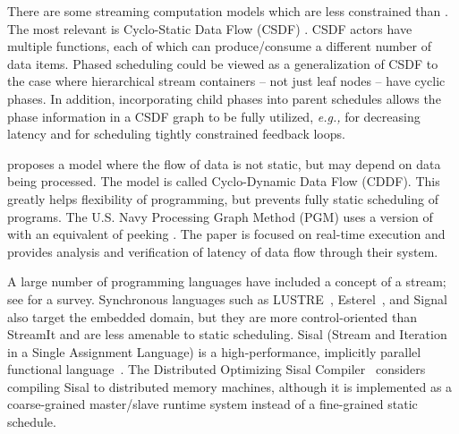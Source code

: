 There are some streaming computation models which are less constrained
than {\SDF}. The most relevant is Cyclo-Static Data Flow (CSDF)
\cite{BELP96,parks95comparison}.  CSDF actors have multiple {\work}
functions, each of which can produce/consume a different number of
data items.  Phased scheduling could be viewed as a generalization of
CSDF to the case where hierarchical stream containers -- not just leaf
nodes -- have cyclic phases.  In addition, incorporating child phases
into parent schedules allows the phase information in a CSDF graph to
be fully utilized, {\it e.g.,} for decreasing latency and for
scheduling tightly constrained feedback loops.

\cite{wauters96cyclodynamic} proposes a model where the flow of data
is not static, but may depend on data being processed. The model is
called Cyclo-Dynamic Data Flow (CDDF). This greatly helps flexibility
of programming, but prevents fully static scheduling of programs. The
U.S. Navy Processing Graph Method (PGM) uses a version of {\SDF} with
an equivalent of peeking \cite{goddard00navy}.  The paper is focused
on real-time execution and provides analysis and verification of
latency of data flow through their system.

A large number of programming languages have included a concept of a
stream; see \cite{survey97} for a survey.  Synchronous languages such
as LUSTRE~\cite{lustre}, Esterel~\cite{esterel92}, and
Signal~\cite{signal} also target the embedded domain, but they are
more control-oriented than StreamIt and are less amenable to static
scheduling.  Sisal (Stream and Iteration in a Single Assignment
Language) is a high-performance, implicitly parallel functional
language~\cite{sisal}.  The Distributed Optimizing Sisal
Compiler~\cite{sisal} considers compiling Sisal to distributed memory
machines, although it is implemented as a coarse-grained master/slave
runtime system instead of a fine-grained static schedule.

